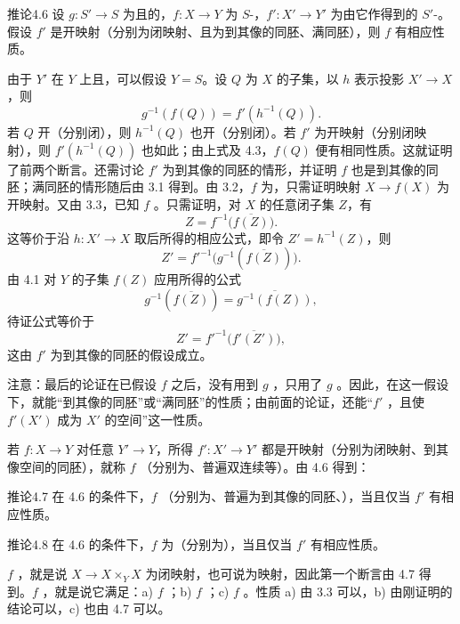 \begin{SGAresult}{推论}{4.6}
设 $g:S'\to S$ 为且的，$f:X\to Y$ 为 $S$-，$f':X'\to Y'$ 为由它作得到的 $S'$-。假设 $f'$ 是开映射（分别为闭映射、且为到其像的同胚、满同胚），则 $f$ 有相应性质。
\end{SGAresult}
由于 $Y'$ 在 $Y$ 上且，可以假设 $Y=S$。设 $Q$ 为 $X$ 的子集，以 $h$ 表示投影 $X'\to X$，则
\[
g^{-1}(f(Q))=f'(h^{-1}(Q)).
\]
若 $Q$ 开（分别闭），则 $h^{-1}(Q)$ 也开（分别闭）。若 $f'$ 为开映射（分别闭映射），则 $f'(h^{-1}(Q))$ 也如此；由上式及 4.3，$f(Q)$ 便有相同性质。这就证明了前两个断言。还需讨论 $f'$ 为到其像的同胚的情形，并证明 $f$ 也是到其像的同胚；满同胚的情形随后由 3.1 得到。由 3.2，$f$ 为，只需证明映射 $X\to f(X)$ 为开映射。又由 3.3，已知 $f$ 。只需证明，对 $X$ 的任意闭子集 $Z$，有
\[
Z=f^{-1}\bigl(\overline{f(Z)}\bigr).
\]
这等价于沿 $h:X'\to X$ 取后所得的相应公式，即令 $Z'=h^{-1}(Z)$，则
\[
Z'=f'^{-1}\bigl(g^{-1}(\overline{f(Z)})\bigr).
\]
由 4.1 对 $Y$ 的子集 $f(Z)$ 应用所得的公式
\[
g^{-1}(\overline{f(Z)})=\overline{g^{-1}(f(Z))},
\]
待证公式等价于
\[
Z'=f'^{-1}\bigl(\overline{f'(Z')}\bigr),
\]
这由 $f'$ 为到其像的同胚的假设成立。

注意：最后的论证在已假设 $f$ 之后，没有用到 $g$ ，只用了 $g$ 。因此，在这一假设下，就能“到其像的同胚”或“满同胚”的性质；由前面的论证，还能“$f'$ ，且使 $f'(X')$ 成为 $X'$ 的空间”这一性质。

若 $f:X\to Y$ 对任意 $Y'\to Y$，所得 $f':X'\to Y'$ 都是开映射（分别为闭映射、到其像空间的同胚），就称 $f$ （分别为、普遍双连续等）。由 4.6 得到：
\begin{SGAresult}{推论}{4.7}
在 4.6 的条件下，$f$ （分别为、普遍为到其像的同胚、），当且仅当 $f'$ 有相应性质。
\end{SGAresult}

\begin{SGAresult}{推论}{4.8}
在 4.6 的条件下，$f$ 为（分别为），当且仅当 $f'$ 有相应性质。
\end{SGAresult}
$f$ ，就是说 $X\to X\times_Y X$ 为闭映射，也可说为映射，因此第一个断言由 4.7 得到。$f$ ，就是说它满足：a) $f$ ；b) $f$ ；c) $f$ 。性质 a) 由 3.3 可以，b) 由刚证明的结论可以，c) 也由 4.7 可以。


